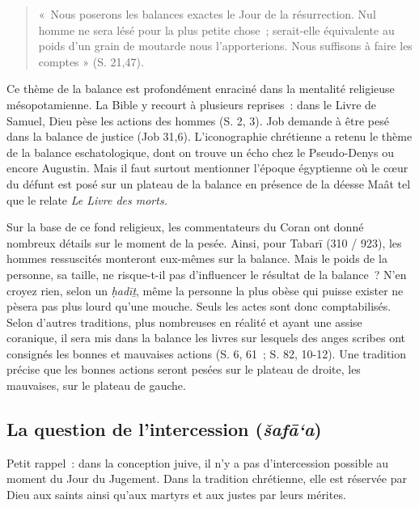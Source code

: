 \begin{quote}
{«~Nous poserons les balances exactes le Jour de la résurrection.
Nul homme ne sera lésé pour la plus petite chose~; serait-elle
équivalente au poids d'un grain de moutarde nous l'apporterions. Nous
suffisons à faire les comptes »} (S. 21,47).~
\end{quote}

Ce thème de la balance est profondément enraciné dans la mentalité
religieuse mésopotamienne. La Bible y recourt à plusieurs reprises~:
dans le Livre de Samuel, Dieu pèse les actions des hommes (S. 2, 3). Job
demande à être pesé dans la balance de justice (Job 31,6).
L'iconographie chrétienne a retenu le thème de la balance
eschatologique, dont on trouve un écho chez le Pseudo-Denys ou encore
Augustin. Mais il faut surtout mentionner l'époque
égyptienne où le cœur du défunt est posé sur un plateau de la balance en
présence de la déesse Maât tel que le relate \emph{Le Livre des morts.}

Sur la base de ce fond religieux, les commentateurs du Coran ont donné
nombreux détails sur le moment de la pesée. Ainsi, pour Tabarī (310 /
923), les hommes ressuscités monteront eux-mêmes sur la balance. Mais le
poids de la personne, sa taille, ne risque-t-il pas d'influencer le
résultat de la balance~? N'en croyez rien, selon un \emph{ḥadīṯ}, même
la personne la plus obèse qui puisse exister ne pèsera pas plus lourd
qu'une mouche. Seuls les actes sont donc comptabilisés. Selon d'autres
traditions, plus nombreuses en réalité et ayant une assise coranique, il
sera mis dans la balance les livres sur lesquels des anges scribes ont
consignés les bonnes et mauvaises actions (S. 6, 61~; S. 82, 10-12). Une
tradition précise que les bonnes actions seront pesées sur le plateau de
droite, les mauvaises, sur le plateau de gauche.


\subsection{La question de l'intercession
(\emph{šafā`a})}

Petit rappel~: dans la conception juive, il n'y a pas d'intercession
possible au moment du Jour du Jugement. Dans la tradition chrétienne,
elle est réservée par Dieu aux saints ainsi qu'aux martyrs et aux justes
par leurs mérites.


